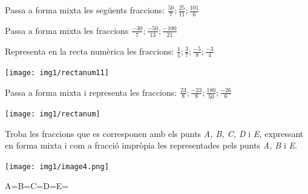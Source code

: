 \begin{mylist}
	\exer \spen  Passa a forma mixta les següents fraccions: $\frac{50}{7} ;\frac{25}{11} ;\frac{101}{6} $
 \vsooo
 
	\exer \spen Passa a forma mixta les fraccions $\frac{-30}{7} ;\frac{-50}{13} ;\frac{-100}{21} $ 
 \vsooo
 
	\exer \spen Representa en la recta numèrica les fraccions: $\frac{1}{5} ;\frac{3}{7} ;\frac{-5}{8} ;\frac{-3}{4} $ 
	\begin{center}
	\texttt{[image: img1/rectanum11]}
	\end{center}
 \vsooo
 
	\exer \spen Passa a forma mixta i representa les fraccions: $\frac{23}{8} ;\frac{-23}{8} ;\frac{180}{50} ;\frac{-26}{6} $ 
	\begin{center}
		\texttt{[image: img1/rectanum]}
	\end{center}
 \vsooo
\newpage
 
	\exer \spen  Troba les fraccions que es corresponen amb els punts \textit{A, B, C, D} i \textit{E, }expressant\textit{ }en forma mixta i com a fracció impròpia les representades pels punts \textit{A, B} i \textit{E}.
 
\texttt{[image: img1/image4.png]}

A=\quad\quad\quad\quad\quad\quad B=\quad\quad\quad\quad\quad\quad  C=\quad\quad\quad\quad\quad\quad  D=\quad\quad\quad\quad\quad\quad E=\quad\quad\quad\quad\quad\quad
 \vsooo

\end{mylist}

